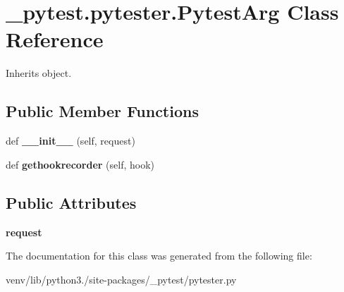 \hypertarget{class__pytest_1_1pytester_1_1_pytest_arg}{}\section{\+\_\+pytest.\+pytester.\+Pytest\+Arg Class Reference}
\label{class__pytest_1_1pytester_1_1_pytest_arg}


Inherits object.

\subsection*{Public Member Functions}
\begin{DoxyCompactItemize}
\item 
\mbox{\label{class__pytest_1_1pytester_1_1_pytest_arg_a1ddde5ce44c9945eb6563b6a41b4ed19}} 
def {\bfseries \+\_\+\+\_\+init\+\_\+\+\_\+} (self, request)
\item 
\mbox{\label{class__pytest_1_1pytester_1_1_pytest_arg_af14a7e87a6dc14b6b2ebbc647dc66105}} 
def {\bfseries gethookrecorder} (self, hook)
\end{DoxyCompactItemize}
\subsection*{Public Attributes}
\begin{DoxyCompactItemize}
\item 
\mbox{\label{class__pytest_1_1pytester_1_1_pytest_arg_af27431757a57968226bf8c94471a3366}} 
{\bfseries request}
\end{DoxyCompactItemize}


The documentation for this class was generated from the following file\+:\begin{DoxyCompactItemize}
\item 
venv/lib/python3./site-\/packages/\+\_\+pytest/pytester.\+py\end{DoxyCompactItemize}
